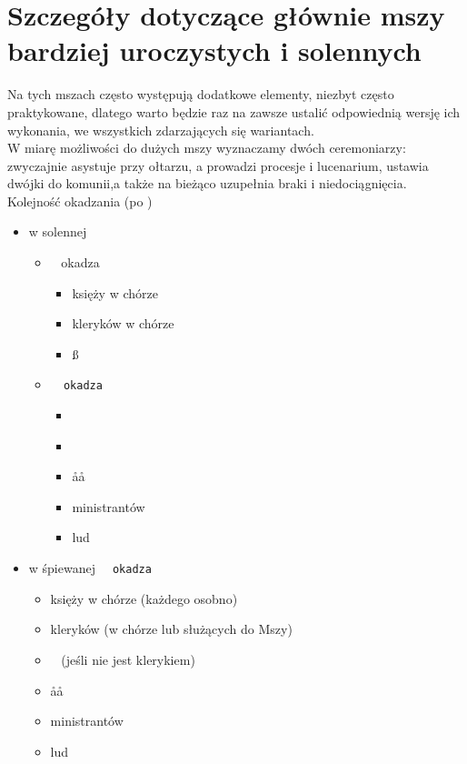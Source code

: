 \section{Szczegóły dotyczące głównie mszy bardziej uroczystych i solennych}

		Na tych mszach często występują dodatkowe elementy, niezbyt często praktykowane, dlatego warto będzie raz na zawsze ustalić odpowiednią wersję ich wykonania, we wszystkich zdarzających się wariantach.\\
		
		\noindent W miarę możliwości do dużych mszy wyznaczamy dwóch ceremoniarzy:  zwyczajnie asystuje \ii przy ołtarzu, a  prowadzi procesje i lucenarium, ustawia dwójki do komunii,a także na bieżąco uzupełnia braki i niedociągnięcia.\\
		
		Kolejność okadzania (po \ii)
		\begin{itemize}
			\item w solennej 
				\begin{itemize}
					\item \dd~ okadza 
						\begin{itemize}
							\item księży w chórze
							\item kleryków w chórze
							\item \ss~
						\end{itemize}
					\item \tt~ okadza
						\begin{itemize}
							\item \dd~
							\item \cc~
							\item \aa\aa~
							\item ministrantów
							\item lud
						\end{itemize}
				\end{itemize}
			\item w śpiewanej \tt~ okadza
				\begin{itemize}
					\item księży w chórze (każdego osobno)
					\item kleryków (w chórze lub służących do Mszy)
					\item \cc~ (jeśli nie jest klerykiem)
					\item \aa\aa~
					\item ministrantów
					\item lud
				\end{itemize}
		\end{itemize}
		
		